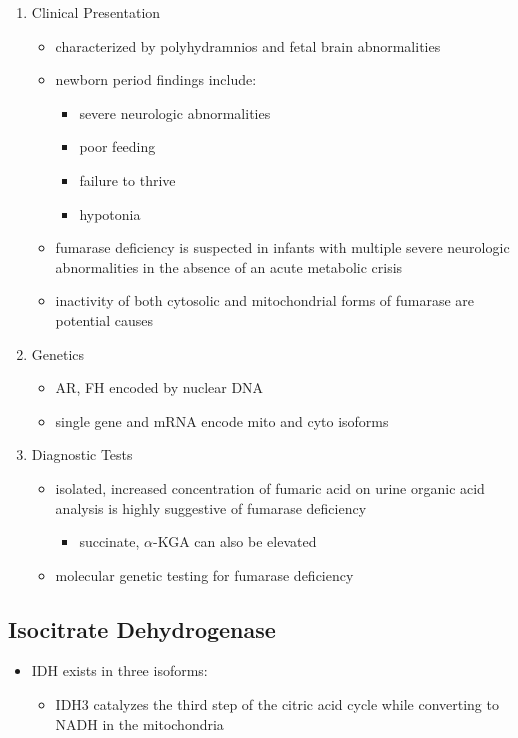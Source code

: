\documentclass{scrartcl}
\begin{document}
\begin{enumerate}
\item Clinical Presentation
\label{sec:org2c8d368}
\begin{itemize}
\item characterized by polyhydramnios and fetal brain abnormalities
\item newborn period findings include:
\begin{itemize}
\item severe neurologic abnormalities
\item poor feeding
\item failure to thrive
\item hypotonia
\end{itemize}
\item fumarase deficiency is suspected in infants with multiple severe
neurologic abnormalities in the absence of an acute metabolic crisis
\item inactivity of both cytosolic and mitochondrial forms of fumarase are
potential causes
\end{itemize}
\item Genetics
\label{sec:orgd8b68ed}
\begin{itemize}
\item AR, FH encoded by nuclear DNA
\item single gene and mRNA encode mito and cyto isoforms
\end{itemize}
\item Diagnostic Tests
\label{sec:org5a58fde}
\begin{itemize}
\item isolated, increased concentration of fumaric acid on urine organic
acid analysis is highly suggestive of fumarase deficiency
\begin{itemize}
\item succinate, \(\alpha\)-KGA can also be elevated
\end{itemize}
\item molecular genetic testing for fumarase deficiency
\end{itemize}
\end{enumerate}
\subsection{Isocitrate Dehydrogenase}
\label{sec:orga41158b}
\begin{itemize}
\item IDH exists in three isoforms:
\begin{itemize}
\item IDH3 catalyzes the third step of the citric acid cycle while
converting  to NADH in the mitochondria
\end{itemize}
\end{itemize}
\end{document}
